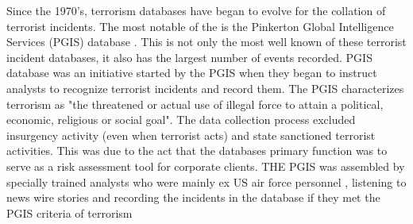 Since the 1970's, terrorism databases have  began to evolve for the collation of terrorist incidents. The most notable of the is the Pinkerton Global Intelligence Services (PGIS) database \citep{dugan2006first}. This is not only the most well known of these terrorist incident databases, it also has the largest number of events recorded. PGIS database was an initiative started by the PGIS when they began to instruct analysts to recognize terrorist incidents and record them. The PGIS characterizes terrorism as "the threatened or actual use of illegal force to attain a political, economic, religious or social goal". The data collection process excluded insurgency activity (even when terrorist acts) and state sanctioned terrorist activities. This was due to the act that the databases primary function was to serve as a risk assessment tool for corporate clients. THE PGIS was assembled by specially trained analysts who were mainly ex US air force personnel \citep{fivethirtyeightGTD2015}, listening to news wire stories and recording the incidents in the database if they met the PGIS criteria of terrorism 

